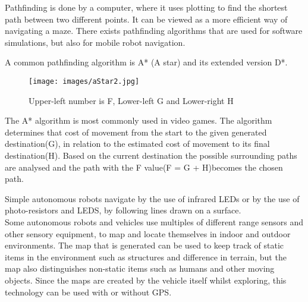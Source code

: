 Pathfinding is done by a computer, where it uses plotting to find the shortest path between two different points. It can be viewed as a more efficient way of navigating a maze.
There exists pathfinding algorithms that are used for software simulations, but also for mobile robot navigation. 

A common pathfinding algorithm is A* (A star) and its extended version D*.

\begin{figure}[H]
\centering
\texttt{[image: images/aStar2.jpg]}
\caption{Upper-left number is F, Lower-left G and Lower-right H}
\label{fig:sub2}
\end{figure}

The A* algorithm is most commonly used in video games. The algorithm determines that cost of movement from the start to the given generated destination(G), in relation to the estimated cost of movement to its final destination(H). Based on the current destination the possible surrounding paths are analysed and the path with the F value(F = G + H)becomes the chosen path.\cite{astar}







Simple autonomous robots navigate by the use of infrared LEDs or by the use of photo-resistors and LEDS, by following lines drawn on a surface.\\
Some autonomous robots and vehicles use multiples of different range sensors and other sensory equipment, to map and locate themselves in indoor and outdoor environments. The map that is generated can be used to keep track of static items in the environment such as structures and difference in terrain, but the map also distinguishes non-static items such as humans and other moving objects. Since the maps are created by the vehicle itself whilst exploring, this technology can be used with or without GPS\cite{rangesens}\cite{rangesensarc}. 


